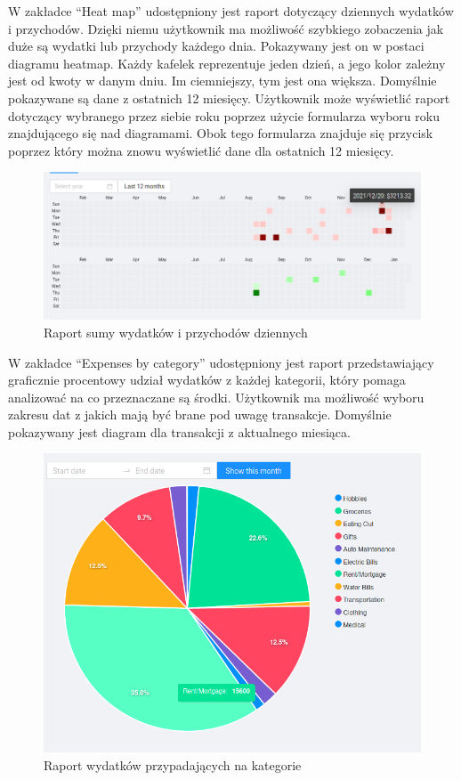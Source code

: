 \documentclass[shortabstract,inz]{iithesis}
\begin{document}
W zakładce ``Heat map'' udostępniony jest raport dotyczący dziennych wydatków i przychodów. Dzięki niemu użytkownik ma możliwość szybkiego zobaczenia jak duże są wydatki lub przychody każdego dnia. Pokazywany jest on w postaci diagramu heatmap. Każdy kafelek reprezentuje jeden dzień, a jego kolor zależny jest od kwoty w danym dniu. Im ciemniejszy, tym jest ona większa. Domyślnie pokazywane są dane z ostatnich 12 miesięcy. Użytkownik może wyświetlić raport dotyczący wybranego przez siebie roku poprzez użycie formularza wyboru roku znajdującego się nad diagramami. Obok tego formularza znajduje się przycisk poprzez który można znowu wyświetlić dane dla ostatnich 12 miesięcy.
\begin{figure}
\centering
	\includegraphics[scale=0.5]{screen-heatmap.png}
	\caption{Raport sumy wydatków i przychodów dziennych}
	\label{fig:screen-heatmap}
\end{figure}

W zakładce ``Expenses by category'' udostępniony jest raport przedstawiający graficznie procentowy udział wydatków z każdej kategorii, który pomaga analizować na co przeznaczane są środki. Użytkownik ma możliwość wyboru zakresu dat z jakich mają być brane pod uwagę transakcje. Domyślnie pokazywany jest diagram dla transakcji z aktualnego miesiąca.
\begin{figure}
\centering
	\includegraphics[scale=0.65]{screen-expenses-chart.png}
	\caption{Raport wydatków przypadających na kategorie}
	\label{fig:screen-expenses-chart}
\end{figure}
\end{document}
